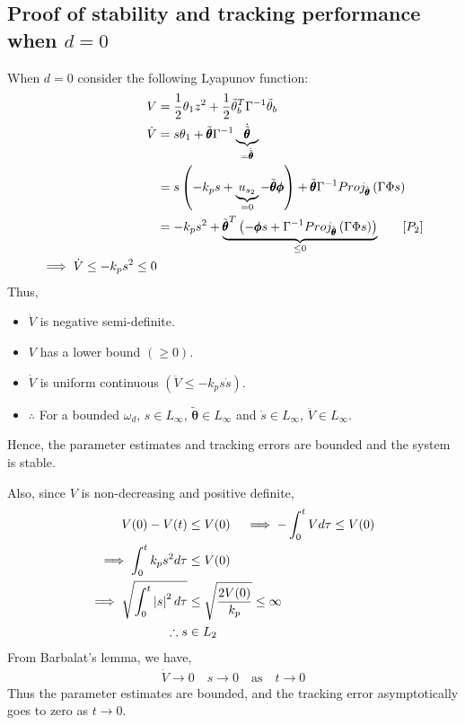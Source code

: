 
\subsection{Proof of stability and tracking performance when $d = 0$}
When $d = 0$ consider the following Lyapunov function:
\begin{align*}
    V &= \frac{1}{2} \theta_1 z^2 + \frac{1}{2} \tilde{\theta}_b^T \Gamma^{-1} \tilde{\theta}_b\\
    \dot V &= s \theta_1 + \tilde{\pmb \theta} \Gamma^{-1} \underbrace{\dot{\tilde{\pmb \theta}}}_{=\dot{\hat{\pmb \theta}}}\\
    &= s \left(  -k_p s + \underbrace{u_{s_2}}_{=0} - \tilde{\pmb \theta} \pmb \phi  \right) + \tilde{\pmb \theta} \Gamma^{-1} Proj_{\hat{\pmb \theta}} \left( \Gamma \Phi s \right)\\
    &= -k_p s^2 + \underbrace{\tilde{\pmb \theta}^T \left( -\pmb \phi s + \Gamma^{-1}Proj_{\hat{\pmb \theta}} \left( \Gamma \Phi s \right) \right)}_{\leq 0} \qquad [P_2]\\
    \implies \dot V \leq -k_p s^2 \leq 0
\end{align*}
Thus,
\begin{itemize}
    \item $\dot V$ is negative semi-definite.
    \item $V$ has a lower bound $(\geq 0)$.
    \item $\dot V$ is uniform continuous $(\ddot V \leq -k_p s \dot s)$.
    \item $\therefore$ For a bounded $\omega_d$, $s \in L_\infty$, $\tilde{\pmb
    \theta} \in L_{\infty}$ and $\dot s \in L_\infty$, $\ddot V \in L_\infty$.
\end{itemize}

Hence, the parameter estimates and tracking errors are bounded and the system is
stable.

\bigskip

Also, since $V$ is non-decreasing and positive definite,
\begin{align*}
    V(0) - V(t) &\leq V(0) \quad
    \implies -\int_0^t V d \tau \leq V(0)\\
    \implies \int_0^t k_p s^2 d \tau &\leq V(0)\\
    \implies \sqrt{\int_0^t \left\lvert s \right\rvert^2 d \tau } &\leq \sqrt{\frac{2 V(0)}{k_p}} \leq \infty\\
    \therefore s &\in L_2
\end{align*}
From Barbalat's lemma, we have,
\begin{align*}
    \dot V \rightarrow 0 \quad s \rightarrow 0 \quad \text{as} \quad t \rightarrow 0
\end{align*}
Thus the parameter estimates are bounded, and the tracking error asymptotically
goes to zero as  $t \rightarrow 0$.
